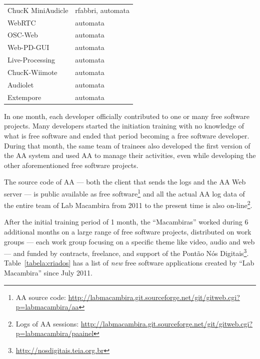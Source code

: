 \documentclass{article}
\begin{document}
\begin{table}
\begin{tabular}{|l|l|}
        ChucK MiniAudicle     & rfabbri, automata                   \\
        WebRTC                & automata                            \\
        OSC-Web               & automata                            \\
        Web-PD-GUI            & automata                            \\
        Live-Processing       & automata                            \\
        ChucK-Wiimote         & automata                            \\
        Audiolet              & automata                            \\
        Extempore             & automata                            \\
        \hline
    \end{tabular}
    \label{tabela:contribuicoes}
\end{table}

In one month, each developer officially contributed to one or many free software
projects. Many developers started the initiation training with no knowledge of what
is free software and ended that period becoming a free software developer.
During that month, the same team of trainees also developed the first version of the AA
system and used AA to manage their activities, even while developing
the other aforementioned free software projects. 

The source code of AA --- both the client that sends the
logs and the AA Web server --- is public available as free software\footnote{AA source
  code:
  \url{http://labmacambira.git.sourceforge.net/git/gitweb.cgi?p=labmacambira/aa}}
and all the actual AA log data of the entire team of Lab Macambira from 2011 to
the present time is also on-line\footnote{Logs of AA sessions:
  \url{http://labmacambira.git.sourceforge.net/git/gitweb.cgi?p=labmacambira/paainel}}.

After the initial training period of 1 month, the ``Macambiras''
worked during 6 additional months on a large range of free software projects, distributed on work
groups --- each work group focusing on a specific theme like video,
audio and web --- and funded by contracts, freelance, and support of the
Pont\~{a}o N\'{o}s Digitais\footnote{\url{http://nosdigitais.teia.org.br}}. 
Table~\ref{tabela:criados} has a list of \emph{new} free software applications created by
``Lab Macambira'' since July 2011.
\end{document}
